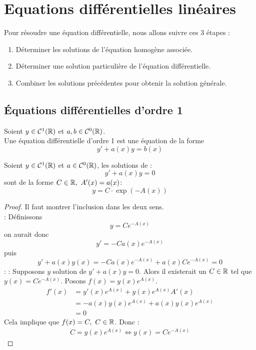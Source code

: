 \chapter{Equations différentielles linéaires}
\def\arraystretch{1}

\noindent Pour résoudre une équation différentielle, nous allons suivre ces 3 étapes :
\begin{enumerate}
	\item Déterminer les solutions de l'équation homogène associée.
	\item Déterminer une solution particulière de l'équation différentielle.
	\item Combiner les solutions précédentes pour obtenir la solution générale.
\end{enumerate}

\section{\'Equations différentielles d'ordre 1}

\begin{definition}
	Soient $y \in \mathcal{C}^1(\mathbb{R})$ et $a, b \in \mathcal{C}^0(\mathbb{R})$. \\
	Une équation différentielle d'ordre 1 est une équation de la forme
	\[ y' + a(x)y = b(x) \]
\end{definition}

\begin{theorem}
	Soient $y \in \mathcal{C}^1(\mathbb{R})$ et $a \in \mathcal{C}^0(\mathbb{R})$, les solutions de :
	\[ y' + a(x)y = 0 \]
	sont de la forme $C \in \mathbb{R},\ A'(x) = a(x)$:
	\[ y = C \cdot \exp(-A(x)) \]
\end{theorem}

\begin{proof}
    Il faut montrer l'inclusion dans les deux sens. \\
    \boxed{\supseteq} :
	Définissons
	\[ y = C e^{-A(x)} \]
	on aurait donc
	\[ y' = -C a(x)e^{-A(x)} \]
	puis
	\[ y' + a(x)y(x) = -C a(x) e^{-A(x)} + a(x)Ce^{-A(x)} = 0 \]
    \boxed{\subseteq} : \cite{bibmath_resolution_eq_diff} :
    Supposons $y$ solution de $y' + a(x) y = 0$.
    Alors il existerait un $C \in \mathbb{R}$ tel que $y(x) = Ce^{-A(x)}$.
    Posons $f(x) = y(x)e^{A(x)}$.
    \begin{align*}
        f'(x) &= y'(x)e^{A(x)} + y(x)e^{A(x)}A'(x) \\
        &= -a(x)y(x)e^{A(x)} + a(x)y(x)e^{A(x)} \\
        &= 0
    \end{align*}
    Cela implique que $f(x) = C,\ C \in \mathbb{R}$. Donc :
    \begin{align*}
        C = y(x)e^{A(x)} \iff y(x) = Ce^{-A(x)}
    \end{align*}
\end{proof}

